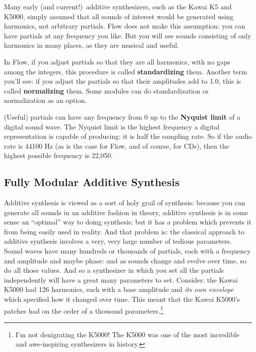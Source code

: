 \documentclass{article}
\newcommand\name{Flow}
\begin{document}
Many early (and current!)\ additive synthesizers, such as the Kawai K5 and K5000, simply assumed that all sounds of interest would be generated using harmonics, not arbitrary partials.   {\name} does not make this assumption: you can have partials at any frequency you like.  But you will see sounds consisting of only harmonics in many places, as they are musical and useful.

In {\name}, if you adjust partials so that they are all harmonics, with no gaps among the integers, this procedure is called {\bf standardizing} them.  Another term you'll see: if you adjust the partials so that their amplitudes add to 1.0, this is called {\bf normalizing} them.  Some modules can do standardization or normalization as an option.

(Useful) partials can have any frequency from 0 up to the {\bf Nyquist limit} of a digital sound wave.  The Nyquist limit is the highest frequency a digital representation is capable of producing: it is half the sampling rate.  So if the audio rate is 44100 Hz (as is the case for {\name}, and of course, for CDs), then the highest possible frequency is 22,050.

\subsection{Fully Modular Additive Synthesis}  Additive synthesis is viewed as a sort of holy grail of synthesis: because you can generate all sounds in an additive fashion in theory, additive synthesis is in some sense an ``optimal'' way to doing synthesis: but it has a problem which prevents it from being easily used in reality.   And that problem is: the classical approach to additive synthesis involves a very, very large number of tedious parameters.  Sound waves have many hundreds or thousands of partials, each with a frequency and amplitude and maybe phase: and as sounds change and evolve over time, so do all those values.  And so a synthesizer in which you set all the partials independently will have a great many parameters to set.  Consider: the Kawai K5000 had 126 harmonics, each with a base amplitude and {\it its own envelope} which specified how it changed over time.  This meant that the Kawai K5000's patches had on the order of a thousand parameters.\footnote{I'm not denigrating the K5000!  The K5000 was one of the most incredible and awe-inspiring synthesizers in history.}
\end{document}
